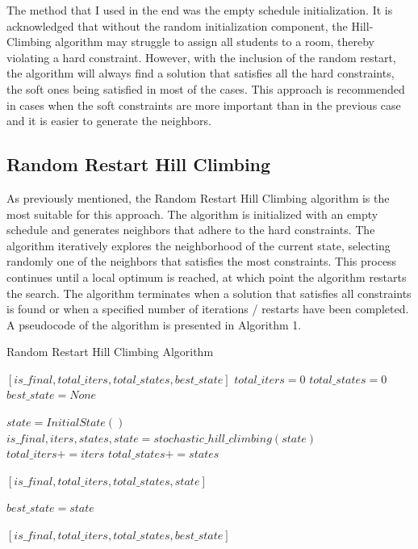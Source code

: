 \documentclass[runningheads]{paper}
\begin{document}
The method that I used in 
the end was the empty schedule initialization. It is acknowledged that without 
the random initialization component, the Hill-Climbing algorithm may struggle 
to assign all students to a room, thereby violating a hard constraint. However,
with  the inclusion of the random restart, the algorithm will always find a 
solution that satisfies all the hard constraints, the soft ones being satisfied 
in most of the cases. This approach is recommended in cases when the soft 
constraints are more important than in the previous case and it is easier to 
generate the neighbors.


\subsection{Random Restart Hill Climbing}

As previously mentioned, the Random Restart Hill Climbing algorithm is the 
most suitable for this approach. The algorithm is initialized with an empty
schedule and generates neighbors that adhere to the hard constraints. The
algorithm iteratively explores the neighborhood of the current state, selecting
randomly one of the neighbors that satisfies the most constraints. This process continues until
a local optimum is reached, at which point the algorithm restarts the search.
The algorithm terminates when a solution that
satisfies all constraints is found or when a specified number of iterations / 
restarts have been completed. A pseudocode of the algorithm is presented in Algorithm 1.

\begin{algorithm}
\caption{Random Restart Hill Climbing Algorithm}
\label{alg1}
\begin{algorithmic}[1]
 \Return $[is\_final, total\_iters, total\_states, best\_state] $ 
\State $total\_iters = 0$
\State $total\_states = 0$
\State $best\_state = None$

\State $state = InitialState()$
\State $is\_final, iters, states, state = stochastic\_hill\_climbing(state)$
\State $total\_iters += iters$
\State $total\_states += states$

\State \Return $[is\_final, total\_iters, total\_states, state]$
\EndIf


\State $best\_state = state$
\EndIf
\EndIf
\EndFor

\State \Return $[is\_final, total\_iters, total\_states, best\_state]$

\end{algorithmic}
\end{algorithm}
\end{document}
